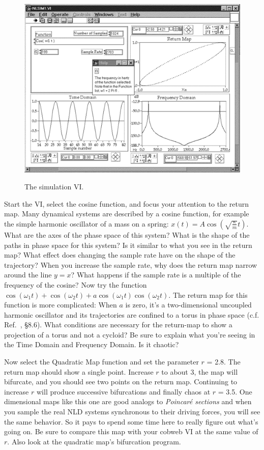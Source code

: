 \documentclass{../lab}
\begin{document}
\begin{figure}[h]
    \centering
    \href{http://experimentationlab.berkeley.edu/sites/default/files/images/Nldimage109.gif}{\includegraphics[width=0.7\linewidth]{images/Nldimage109.png}}
    \caption{The simulation VI.}
    \label{fig:SimulationVI}
\end{figure}

Start the VI, select the cosine function, and focus your attention to the return map. Many dynamical systems are described by a cosine function, for example the simple harmonic oscillator of a mass on a spring: $x(t) = A \cos(\sqrt{\frac{\kappa}{m}}t)$. What are the axes of the phase space of this system? What is the shape of the paths in phase space for this system? Is it similar to what you see in the return map? What effect does changing the sample rate have on the shape of the trajectory? When you increase the sample rate, why does the return map narrow around the line $y = x$? What happens if the sample rate is a multiple of the frequency of the cosine? Now try the function $\cos {(\omega_1t)} + \cos(\omega_2t) + a \cos(\omega_1t) \cos(\omega_2t)$. The return map for this function is more complicated: When $a$ is zero, it's a two-dimensional uncoupled harmonic oscillator and its trajectories are confined to a torus in phase space (c.f. Ref.~\cite{Strogatz}, \S8.6). What conditions are necessary for the return-map to show a projection of a torus and not a cycloid? Be sure to explain what you're seeing in the Time Domain and Frequency Domain. Is it chaotic?

Now select the Quadratic Map function and set the parameter $r$ = 2.8. The return map should show a single point. Increase $r$ to about 3, the map will bifurcate, and you should see two points on the return map. Continuing to increase $r$ will produce successive bifurcations and finally chaos at $r$ = 3.5. One dimensional maps like this one are good analogs to \emph{Poincaré sections} and when you sample the real NLD systems synchronous to their driving forces, you will see the same behavior. So it pays to spend some time here to really figure out what's going on. Be sure to compare this map with your cobweb VI at the same value of $r$. Also look at the quadratic map's bifurcation program.
\end{document}
